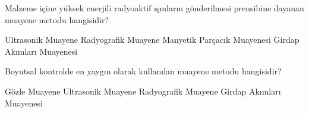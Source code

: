 \begin{question}[subtitle=]
	Malzeme içine yüksek enerjili radyoaktif  ışınların gönderilmesi prensibine dayanan muayene metodu hangisidir?
	
	\begin{tasks}
		\task Ultrasonik Muayene
		\task Radyografik Muayene \correct
		\task Manyetik Parçacık Muayenesi
		\task Girdap Akımları Muayenesi
	\end{tasks}
\end{question}
\begin{solution}
	\correct
\end{solution}

\begin{question}[subtitle=]
	Boyutsal kontrolde en yaygın olarak kullanılan muayene metodu hangisidir?
	
	\begin{tasks}
		\task Gözle Muayene \correct
		\task Ultrasonik Muayene
		\task Radyografik Muayene
		\task Girdap Akımları Muayenesi
	\end{tasks}
\end{question}
\begin{solution}
	\correct
\end{solution}